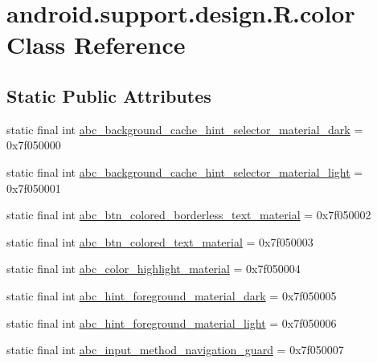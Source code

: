 \hypertarget{classandroid_1_1support_1_1design_1_1_r_1_1color}{}\section{android.\+support.\+design.\+R.\+color Class Reference}
\label{classandroid_1_1support_1_1design_1_1_r_1_1color}
\subsection*{Static Public Attributes}
\begin{DoxyCompactItemize}
\item 
static final int \mbox{\hyperlink{classandroid_1_1support_1_1design_1_1_r_1_1color_a3bc2369d5b8b40574722eba1c4ed66e8}{abc\+\_\+background\+\_\+cache\+\_\+hint\+\_\+selector\+\_\+material\+\_\+dark}} = 0x7f050000
\item 
static final int \mbox{\hyperlink{classandroid_1_1support_1_1design_1_1_r_1_1color_a836a7fae9079ef65b027b79704cebc14}{abc\+\_\+background\+\_\+cache\+\_\+hint\+\_\+selector\+\_\+material\+\_\+light}} = 0x7f050001
\item 
static final int \mbox{\hyperlink{classandroid_1_1support_1_1design_1_1_r_1_1color_a92647d146b5c02cd7b7ca24f4206ae80}{abc\+\_\+btn\+\_\+colored\+\_\+borderless\+\_\+text\+\_\+material}} = 0x7f050002
\item 
static final int \mbox{\hyperlink{classandroid_1_1support_1_1design_1_1_r_1_1color_a4d85412943ac3b26bc869cc43b3b9c06}{abc\+\_\+btn\+\_\+colored\+\_\+text\+\_\+material}} = 0x7f050003
\item 
static final int \mbox{\hyperlink{classandroid_1_1support_1_1design_1_1_r_1_1color_aa538e5e8510d682489fe209c4455e24a}{abc\+\_\+color\+\_\+highlight\+\_\+material}} = 0x7f050004
\item 
static final int \mbox{\hyperlink{classandroid_1_1support_1_1design_1_1_r_1_1color_ae972150834d21dd435f3b1a076b2ec5c}{abc\+\_\+hint\+\_\+foreground\+\_\+material\+\_\+dark}} = 0x7f050005
\item 
static final int \mbox{\hyperlink{classandroid_1_1support_1_1design_1_1_r_1_1color_a8e600497f2479110bb0fda5f511c7e6d}{abc\+\_\+hint\+\_\+foreground\+\_\+material\+\_\+light}} = 0x7f050006
\item 
static final int \mbox{\hyperlink{classandroid_1_1support_1_1design_1_1_r_1_1color_a6bc1f7e07ac7632cfbed86d43f972968}{abc\+\_\+input\+\_\+method\+\_\+navigation\+\_\+guard}} = 0x7f050007

\end{DoxyCompactItemize}
